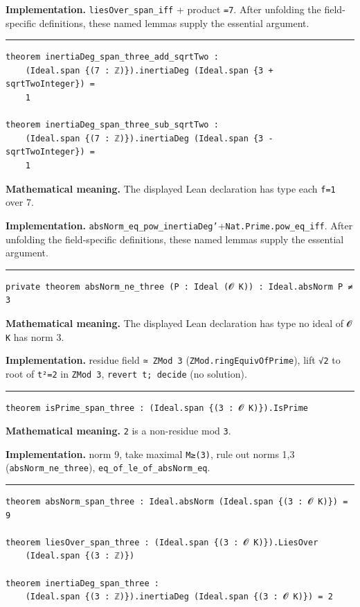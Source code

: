 \documentclass[UTF8,a4paper,11pt,fontset=fandol]{ctexart}
\theoremstyle{definition}
\newcommand{\statementsep}{\par\medskip\hrule\medskip}
\begin{document}
\noindent\textbf{Implementation.} \texttt{liesOver\_\allowbreak{}span\_\allowbreak{}iff} + product \texttt{=7}. After unfolding the field-specific definitions, these named lemmas supply the essential argument.\par
\statementsep
\begin{verbatim}
theorem inertiaDeg_span_three_add_sqrtTwo :
    (Ideal.span {(7 : ℤ)}).inertiaDeg (Ideal.span {3 + sqrtTwoInteger}) =
    1

theorem inertiaDeg_span_three_sub_sqrtTwo :
    (Ideal.span {(7 : ℤ)}).inertiaDeg (Ideal.span {3 - sqrtTwoInteger}) =
    1
\end{verbatim}
\noindent\textbf{Mathematical meaning.} The displayed Lean declaration has type each \texttt{f=1} over 7.\par
\noindent\textbf{Implementation.} \texttt{absNorm\_\allowbreak{}eq\_\allowbreak{}pow\_\allowbreak{}inertiaDeg'}+\texttt{Nat.\allowbreak{}Prime.\allowbreak{}pow\_\allowbreak{}eq\_\allowbreak{}iff}. After unfolding the field-specific definitions, these named lemmas supply the essential argument.\par
\statementsep
\begin{verbatim}
private theorem absNorm_ne_three (P : Ideal (𝓞 K)) : Ideal.absNorm P ≠ 3
\end{verbatim}
\noindent\textbf{Mathematical meaning.} The displayed Lean declaration has type no ideal of \texttt{𝓞 K} has norm 3.\par
\noindent\textbf{Implementation.} residue field \texttt{≃ ZMod 3} (\texttt{ZMod.\allowbreak{}ringEquivOfPrime}), lift \texttt{√2} to root of \texttt{t²=2} in \texttt{ZMod 3}, \texttt{revert t; decide} (no solution).\par
\statementsep
\begin{verbatim}
theorem isPrime_span_three : (Ideal.span {(3 : 𝓞 K)}).IsPrime
\end{verbatim}
\noindent\textbf{Mathematical meaning.} \texttt{2} is a non-residue mod \texttt{3}.\par
\noindent\textbf{Implementation.} norm 9, take maximal \texttt{M≥(3)}, rule out norms 1,3 (\texttt{absNorm\_\allowbreak{}ne\_\allowbreak{}three}), \texttt{eq\_\allowbreak{}of\_\allowbreak{}le\_\allowbreak{}of\_\allowbreak{}absNorm\_\allowbreak{}eq}.\par
\statementsep
\begin{verbatim}
theorem absNorm_span_three : Ideal.absNorm (Ideal.span {(3 : 𝓞 K)}) = 9

theorem liesOver_span_three : (Ideal.span {(3 : 𝓞 K)}).LiesOver
    (Ideal.span {(3 : ℤ)})

theorem inertiaDeg_span_three :
    (Ideal.span {(3 : ℤ)}).inertiaDeg (Ideal.span {(3 : 𝓞 K)}) = 2
\end{verbatim}
\end{document}
